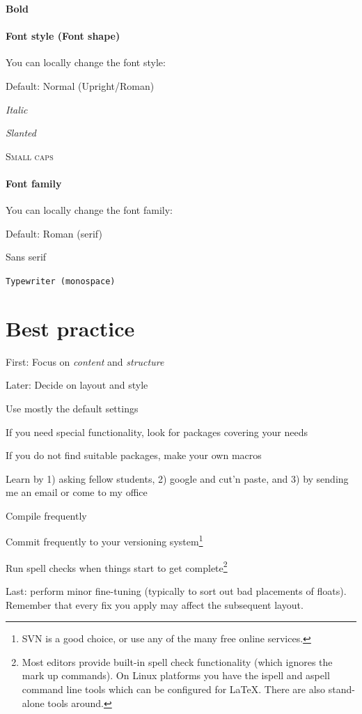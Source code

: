     \textbf{Bold}
    
    
\paragraph{Font style (Font shape)}
You can locally change the font style:
    
    \textup{Default: Normal (Upright/Roman)}
    
    \textit{Italic}
    
    \textsl{Slanted}
    
    \textsc{Small caps}
    
\paragraph{Font family}
You can locally change the font family:
    
    \textrm{Default: Roman (serif)}
    
    \textsf{Sans serif}
    
    \texttt{Typewriter (monospace)}
    

\section{Best practice}
\label{sec:bestpractise}

\begin{compactitem}
\item First: Focus on {\em content} and {\em structure} 
\item Later: Decide on layout and style
\item Use mostly the default settings
\item If you need special functionality, look for packages covering your needs
\item If you do not find suitable packages, make your own macros
\item Learn by 1) asking fellow students, 2) google and cut'n paste, and 3) by sending me an email or come to my office
\item Compile frequently
\item Commit frequently to your versioning system\footnote{SVN is a good choice, or use any of the many free online services.}
\item Run spell checks when things start to get complete\footnote{Most editors provide built-in spell check functionality (which ignores the mark up commands).  On Linux platforms you have the ispell and aspell command line tools which can be configured for \LaTeX. There are also stand-alone tools around.}
\item Last: perform minor fine-tuning (typically to sort out bad placements of floats). Remember that every fix you apply may affect the subsequent layout.
\end{compactitem}



